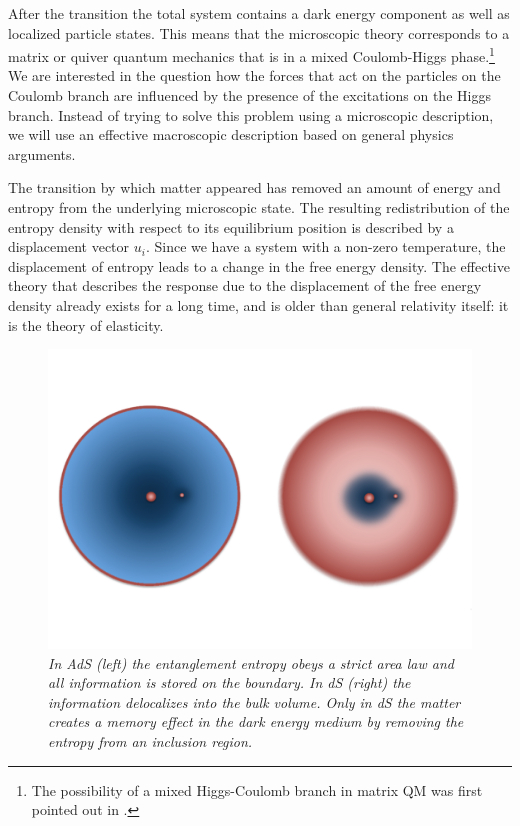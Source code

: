 \documentclass[a4paper,12pt]{article}
\begin{document}
After the transition the total system contains a dark energy component as well as localized particle states.  This means that the microscopic theory corresponds to a matrix or quiver quantum mechanics that is in a mixed Coulomb-Higgs phase.\footnote{The possibility of a mixed Higgs-Coulomb branch in matrix QM was first pointed out in \cite{WittenHiggs}.}  We are interested in the question how the forces that act on the particles on the Coulomb branch are influenced by the presence of the excitations on the Higgs branch.  Instead of trying to solve this problem using a microscopic description, we will use an effective macroscopic description based on general physics arguments. 

The transition by which matter   appeared has removed an amount of energy and entropy from the underlying microscopic state.  The resulting redistribution of the entropy density with respect to its equilibrium position is described by a displacement vector $u_i$.  Since we have a system with a non-zero temperature, the displacement of entropy leads to a change in the free energy density. The effective theory that describes the response due to the displacement of the free energy density already exists for a long time, and is older than general relativity itself: it is the theory of elasticity. 

 \begin{figure}[btp]
\begin{center}
\vspace{-2.2 cm}
\includegraphics[scale=0.40]{ElasticPhase3.pdf}
\vspace{-2.0 cm}
\end{center}
\caption{\small \it  In AdS (left) the entanglement entropy obeys a strict area law and all information is stored on the boundary.  In dS (right) the information delocalizes into the bulk volume. Only in dS the matter creates a memory effect in the dark energy medium by removing the entropy from an inclusion region.}
\end{figure}
\end{document}
